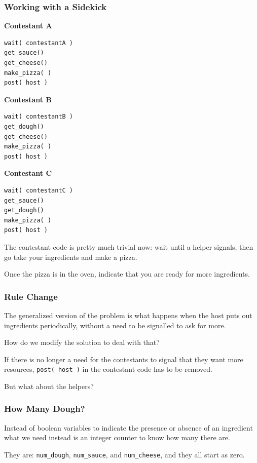 \begin{frame}[fragile]
	\frametitle{Working with a Sidekick}

	\begin{multicols}{3}
		\textbf{Contestant A}
		\begin{lstlisting}
wait( contestantA )
get_sauce()
get_cheese()
make_pizza( )
post( host )
\end{lstlisting}
		\columnbreak
		\textbf{Contestant B}
		\begin{lstlisting}
wait( contestantB )
get_dough()
get_cheese()
make_pizza( )
post( host )
\end{lstlisting}
		\columnbreak
		\textbf{Contestant C}
		\begin{lstlisting}
wait( contestantC )
get_sauce()
get_dough()
make_pizza( )
post( host )
\end{lstlisting}
	\end{multicols}

	The contestant code is pretty much trivial now: wait until a helper signals, then go take your ingredients and make a pizza.

	Once the pizza is in the oven, indicate that you are ready for more ingredients.

\end{frame}

\begin{frame}
	\frametitle{Rule Change}

	The generalized version of the problem is what happens when the host puts out ingredients periodically, without a need to be signalled to ask for more.

	How do we modify the solution to deal with that?

	If there is no longer a need for the contestants to signal that they want more resources, \texttt{post( host )} in the contestant code has to be removed.

	But what about the helpers?

\end{frame}

\begin{frame}
	\frametitle{How Many Dough?}

	Instead of boolean variables to indicate the presence or absence of an ingredient what we need instead is an integer counter to know how many there are.

	They are: \texttt{num\_dough}, \texttt{num\_sauce}, and \texttt{num\_cheese}, and they all start as zero.

\end{frame}


